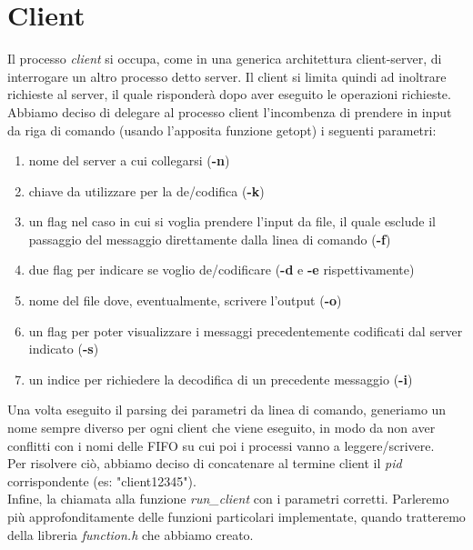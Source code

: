 \documentclass[a4paper,9pt]{article}
\begin{document}
\section{Client}
Il processo \emph{client} si occupa, come in una generica architettura client-server, di interrogare un altro processo detto server. Il client si limita quindi ad inoltrare richieste al server, il quale risponderà dopo aver eseguito le operazioni richieste.\\
Abbiamo deciso di delegare al processo client l'incombenza di prendere in input da riga di comando (usando l'apposita funzione getopt) i seguenti parametri:
\begin{enumerate}
\item nome del server a cui collegarsi (\textbf{-n})
\item chiave da utilizzare per la de/codifica (\textbf{-k})
\item un flag nel caso in cui si voglia prendere l'input da file, il quale esclude il passaggio del messaggio direttamente dalla linea di comando (\textbf{-f})
\item due flag per indicare se voglio de/codificare (\textbf{-d} e \textbf{-e} rispettivamente)
\item nome del file dove, eventualmente, scrivere l'output (\textbf{-o})
\item un flag per poter visualizzare i messaggi precedentemente codificati dal server indicato (\textbf{-s})
\item un indice per richiedere la decodifica di un precedente messaggio (\textbf{-i})
\end{enumerate}
Una volta eseguito il parsing dei parametri da linea di comando, generiamo un nome sempre diverso per ogni client che viene eseguito, in modo da non aver conflitti con i nomi delle FIFO su cui poi i processi vanno a leggere/scrivere.\\
Per risolvere ciò, abbiamo deciso di concatenare al termine client il \emph{pid} corrispondente (es: "client12345").\\
Infine, la chiamata alla funzione \emph{run\_client} con i parametri corretti. Parleremo più approfonditamente delle funzioni particolari implementate, quando tratteremo della libreria \emph{function.h} che abbiamo creato.
\end{document}
